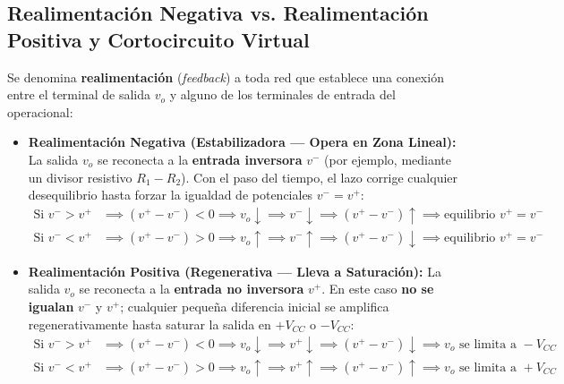 \subsection{Realimentación Negativa vs. Realimentación Positiva y Cortocircuito Virtual}

Se denomina \textbf{realimentación} (\textit{feedback}) a toda red que establece una conexión entre el terminal de salida $v_o$ y alguno de los terminales de entrada del operacional:

\begin{itemize}[leftmargin=*]
    \item \textbf{Realimentación Negativa (Estabilizadora --- Opera en Zona Lineal):}
    La salida $v_o$ se reconecta a la \textbf{entrada inversora} $v^-$ (por ejemplo, mediante un divisor resistivo $R_1 - R_2$). Con el paso del tiempo, el lazo corrige cualquier desequilibrio hasta forzar la igualdad de potenciales $v^- = v^+$:
    \begin{align*}
        \text{Si } v^- > v^+ &\implies (v^+ - v^-) < 0 \implies v_o \downarrow \implies v^- \downarrow \implies (v^+ - v^-) \uparrow \implies \text{equilibrio } v^+ = v^- \\
        \text{Si } v^- < v^+ &\implies (v^+ - v^-) > 0 \implies v_o \uparrow \implies v^- \uparrow \implies (v^+ - v^-) \downarrow \implies \text{equilibrio } v^+ = v^-
    \end{align*}
    \item \textbf{Realimentación Positiva (Regenerativa --- Lleva a Saturación):}
    La salida $v_o$ se reconecta a la \textbf{entrada no inversora} $v^+$. En este caso \textbf{no se igualan} $v^-$ y $v^+$; cualquier pequeña diferencia inicial se amplifica regenerativamente hasta saturar la salida en $+V_{CC}$ o $-V_{CC}$:
    \begin{align*}
        \text{Si } v^- > v^+ &\implies (v^+ - v^-) < 0 \implies v_o \downarrow \implies v^+ \downarrow \implies (v^+ - v^-) \downarrow \implies v_o \text{ se limita a } -V_{CC} \\
        \text{Si } v^- < v^+ &\implies (v^+ - v^-) > 0 \implies v_o \uparrow \implies v^+ \uparrow \implies (v^+ - v^-) \uparrow \implies v_o \text{ se limita a } +V_{CC}
    \end{align*}
\end{itemize}

